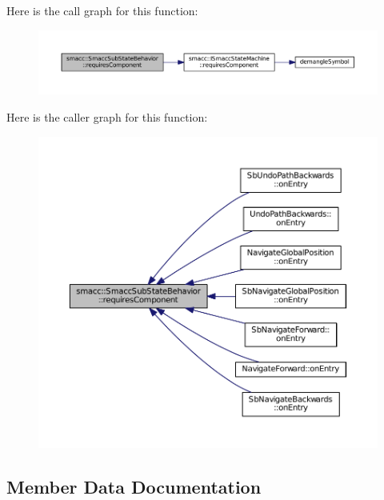 Here is the call graph for this function\+:
\nopagebreak
\begin{figure}[H]
\begin{center}
\leavevmode
\includegraphics[width=350pt]{classsmacc_1_1SmaccSubStateBehavior_a9f31f62f886cc06017e92fa0d834b12d_cgraph}
\end{center}
\end{figure}




Here is the caller graph for this function\+:
\nopagebreak
\begin{figure}[H]
\begin{center}
\leavevmode
\includegraphics[width=350pt]{classsmacc_1_1SmaccSubStateBehavior_a9f31f62f886cc06017e92fa0d834b12d_icgraph}
\end{center}
\end{figure}




\subsection{Member Data Documentation}
